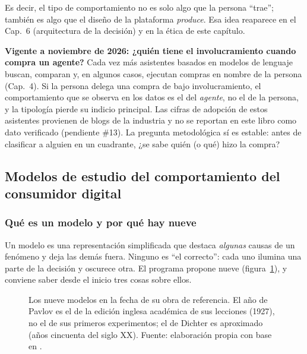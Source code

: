 Es decir, el tipo de comportamiento no es solo algo que la persona \enquote{trae};
también es algo que el diseño de la plataforma \emph{produce}. Esa idea
reaparece en el Cap.~6 (arquitectura de la decisión) y en la ética de este
capítulo.

\begin{cajaFrontera}
\textbf{Vigente a noviembre de 2026: ¿quién tiene el involucramiento cuando
compra un agente?} Cada vez más asistentes basados en modelos de lenguaje
buscan, comparan y, en algunos casos, ejecutan compras en nombre de la persona
(Cap.~4). Si la persona delega una compra de bajo involucramiento, el
comportamiento que se observa en los datos es el del \emph{agente}, no el de la
persona, y la tipología pierde su indicio principal. Las cifras de adopción de
estos asistentes provienen de blogs de la industria y no se reportan en este
libro como dato verificado (pendiente \#13). La pregunta metodológica sí es
estable: antes de clasificar a alguien en un cuadrante, ¿se sabe quién (o qué)
hizo la compra?
\end{cajaFrontera}

\subsection{Modelos de estudio del comportamiento del consumidor digital}

\subsubsection{Qué es un modelo y por qué hay nueve}

Un modelo es una representación simplificada que destaca \emph{algunas} causas
de un fenómeno y deja las demás fuera. Ninguno es \enquote{el correcto}: cada
uno ilumina una parte de la decisión y oscurece otra. El programa propone nueve
(figura~\ref{fig:cap09-linea}), y conviene saber desde el inicio tres cosas
sobre ellos.

\begin{figure}[!htb]
  \centering
  \resizebox{\textwidth}{!}{}
  \caption{Los nueve modelos en la fecha de su obra de referencia. El año de
  Pavlov es el de la edición inglesa académica de sus lecciones (1927), no el de
  sus primeros experimentos; el de Dichter es aproximado (años cincuenta del
  siglo XX). Fuente: elaboración propia con base en \textcite{marshall1890,
  veblen1899,pavlov1927,maslow1943,dichter1960,howardsheth1969,fishbein1975,
  oshaughnessy1987,kozinets2002}.}
  \label{fig:cap09-linea}
\end{figure}

